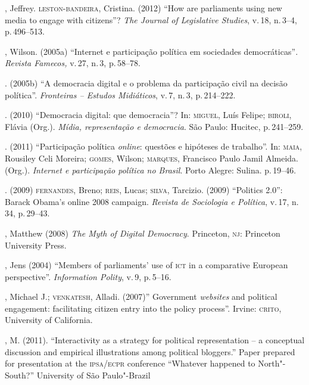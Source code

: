 \begin{bibliohedra}
, Jeffrey. \textsc{leston}-\textsc{bandeira}, Cristina. (2012) ``How are
parliaments using new media to engage with citizens''? \textit{The Journal
of Legislative Studies}, v.\,18, n.\,3--4, p.\,496--513.

, Wilson. (2005a) ``Internet e participação política em sociedades
democráticas''\textit{. Revista Famecos,} v.\,27, n.\,3, p.\,58--78.

\titidem. (2005b) ``A democracia digital e o problema da
participação civil na decisão política''. \textit{Fronteiras -- Estudos
Midiáticos}, v.\,7, n.\,3, p.\,214--222.

\titidem. (2010) ``Democracia digital: que democracia''? In:
\textsc{miguel}, Luís Felipe; \textsc{biroli}, Flávia (Org.). \textit{Mídia, representação e
democracia}. São Paulo: Hucitec, p.\,241--259.

\titidem. (2011) ``Participação política \textit{online}: questões e
hipóteses de trabalho''. In: \textsc{maia}, Rousiley Celi Moreira; \textsc{gomes}, Wilson;
\textsc{marques}, Francisco Paulo Jamil Almeida. (Org.). \textit{Internet e
participação política no Brasil}. Porto Alegre: Sulina. p.\,19--46.

\titidem. (2009) \textsc{fernandes}, Breno; \textsc{reis}, Lucas; \textsc{silva}, Tarcizio.
(2009) ``Politics 2.0'': Barack Obama's online 2008 campaign.
\textit{Revista de Sociologia e Política}, v.\,17, n.\,34, p.\,29--43.

, Matthew (2008) \textit{The Myth of Digital Democracy}. Princeton,
\textsc{nj}: Princeton University Press.

, Jens (2004) ``Members of parliaments' use of \textsc{ict} in a comparative
European perspective''. \textit{Information Polity}, v.\,9, p.\,5--16.

, Michael J.; \textsc{venkatesh}, Alladi. (2007)'' Government \textit{websites} and
political engagement: facilitating citizen entry into the policy
process''. Irvine: \textsc{crito}, University of California. 

, M. (2011). ``Interactivity as a strategy for political
representation -- a conceptual discussion and empirical illustrations
among political bloggers.'' Paper prepared for presentation at the
\textsc{ipsa}/\textsc{ecpr} conference ``Whatever happened to North"-South?'' University of
São Paulo"-Brazil


\end{bibliohedra}
